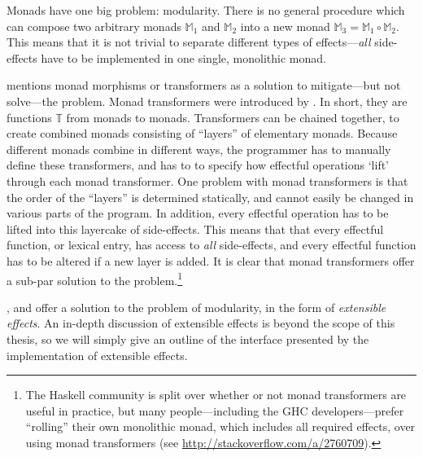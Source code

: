 \vspace*{\baselineskip}

Monads have one big problem: modularity. There is no general procedure
which can compose two arbitrary monads $\mathbb{M}_1$ and
$\mathbb{M}_2$ into a new monad $\mathbb{M}_3 = \mathbb{M}_1 \circ
\mathbb{M}_2$. This means that it is not trivial to separate different
types of effects---\emph{all} side-effects have to be implemented in
one single, monolithic monad.

\citet{shan2002} mentions monad morphisms or transformers as a
solution to mitigate---but not solve---the problem.
Monad transformers were introduced by \citet{liang1995}. In short,
they are functions $\mathbb{T}$ from monads to monads. Transformers
can be chained together, to create combined monads consisting of
``layers'' of elementary monads. Because different monads combine in
different ways, the programmer has to manually define these
transformers, and has to to specify how effectful operations `lift'
through each monad transformer.
One problem with monad transformers is that the order of the
``layers'' is determined statically, and cannot easily be changed in
various parts of the program. In addition, every effectful operation
has to be lifted into this layercake of side-effects. This means that
that every effectful function, or lexical entry, has access to
\emph{all} side-effects, and every effectful function has to be
altered if a new layer is added. It is clear that monad transformers
offer a sub-par solution to the problem.\footnote{%
  The Haskell community is split over whether or not monad
  transformers are useful in practice, but many people---including the
  GHC developers---prefer ``rolling'' their own monolithic monad,
  which includes all required effects, over using monad transformers
  (see \url{http://stackoverflow.com/a/2760709}).
}

\citet{cartwright1994}, \citet{kiselyov2013} and \citet{kiselyov2015}
offer a solution to the problem of modularity, in the form of
\emph{extensible effects}. An in-depth discussion of extensible
effects is beyond the scope of this thesis, so we will simply give an
outline of the interface presented by the \citeyear{kiselyov2015}
implementation of extensible effects.

